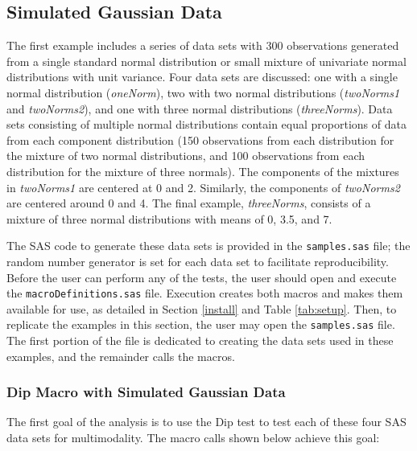 \documentclass[]{interact}
\theoremstyle{plain}%
\theoremstyle{definition}
\theoremstyle{remark}
\begin{document}
\subsection{Simulated Gaussian %
Data}\label{normalexamples}
The first example includes a series of data sets with 300 observations generated from a single standard normal distribution or small mixture of univariate normal distributions with unit variance. Four data sets are discussed: one with a single normal distribution (\textit{oneNorm}), two with two normal distributions (\textit{twoNorms1} and \textit{twoNorms2}), and one with three normal distributions (\textit{threeNorms}). %
Data sets consisting of multiple normal distributions contain equal proportions of data from each component distribution (150 observations from each distribution for the mixture of two normal distributions, and 100 observations from each distribution for the mixture of three normals). 
The components of the mixtures in \textit{twoNorms1} are centered at 0 and 2. Similarly, the components of \textit{twoNorms2} are centered around 0 and 4. The final example, \textit{threeNorms}, consists of a mixture of three normal distributions with means of 0, 3.5, and 7. %

The SAS code to generate these data sets is provided in the \texttt{samples.sas} file; the random number generator is set for each data set to facilitate reproducibility. Before the user can perform any of the tests, the user should %
open and execute the \texttt{macroDefinitions.sas} file. Execution creates both macros and makes them available for use, as detailed in Section \ref{install} and Table \ref{tab:setup}. Then, to replicate the examples in this section, the user may open the \texttt{samples.sas} file. The first portion of the file is dedicated to creating the data sets used in these examples, and the remainder calls the macros. %

\subsubsection{Dip Macro with Simulated Gaussian Data}
The first goal of the analysis is to use the Dip test to test each of these four SAS data sets for multimodality. The macro calls shown below achieve this goal:
\end{document}
